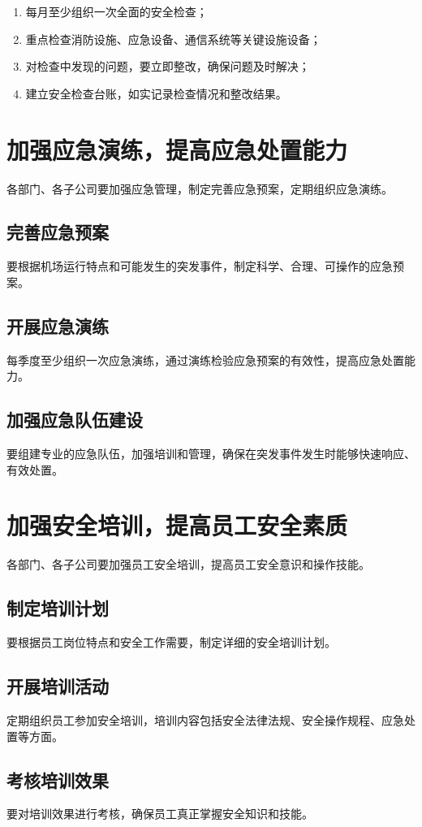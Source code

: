 \documentclass{common-doc}
\begin{document}
\begin{enumerate}
\item 每月至少组织一次全面的安全检查；
\item 重点检查消防设施、应急设备、通信系统等关键设施设备；
\item 对检查中发现的问题，要立即整改，确保问题及时解决；
\item 建立安全检查台账，如实记录检查情况和整改结果。
\end{enumerate}

\section{加强应急演练，提高应急处置能力}
各部门、各子公司要加强应急管理，制定完善应急预案，定期组织应急演练。

\subsection{完善应急预案}
要根据机场运行特点和可能发生的突发事件，制定科学、合理、可操作的应急预案。

\subsection{开展应急演练}
每季度至少组织一次应急演练，通过演练检验应急预案的有效性，提高应急处置能力。

\subsection{加强应急队伍建设}
要组建专业的应急队伍，加强培训和管理，确保在突发事件发生时能够快速响应、有效处置。

\section{加强安全培训，提高员工安全素质}
各部门、各子公司要加强员工安全培训，提高员工安全意识和操作技能。

\subsection{制定培训计划}
要根据员工岗位特点和安全工作需要，制定详细的安全培训计划。

\subsection{开展培训活动}
定期组织员工参加安全培训，培训内容包括安全法律法规、安全操作规程、应急处置等方面。

\subsection{考核培训效果}
要对培训效果进行考核，确保员工真正掌握安全知识和技能。
\end{document}

